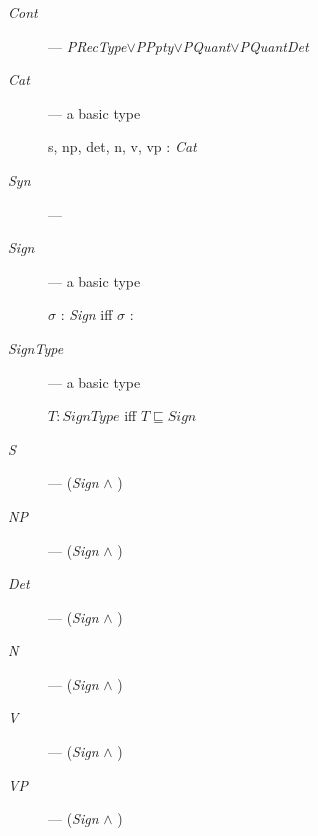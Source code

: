\begin{description}
    \item[\textnormal{\textit{Cont}}] --- \textit{PRecType}$\vee$\textit{PPpty}$\vee$\textit{PQuant}$\vee$\textit{PQuantDet}

      
    \item[\textnormal{\textit{Cat}}] --- a basic type

      s, np, det, n, v, vp : \textit{Cat}

    
    \item[\textnormal{\textit{Syn}}] ---   
 


  
    \item[\textnormal{\textit{Sign}}] ---  a basic type

      $\sigma$ : \textit{Sign} iff $\sigma$ :

  
\item[\textnormal{\textit{SignType}}] --- a basic type

  $T:\textit{SignType}$ iff $T\sqsubseteq\textit{Sign}$ 

  
\item[\textnormal{\textit{S}}] --- (\textit{Sign} \d{$\wedge$}
  )
  
\item[\textnormal{\textit{NP}}] --- (\textit{Sign} \d{$\wedge$}
  )

  
\item[\textnormal{\textit{Det}}] --- (\textit{Sign} \d{$\wedge$}
  )
  
\item[\textnormal{\textit{N}}] --- (\textit{Sign} \d{$\wedge$}
  )
  
\item[\textnormal{\textit{V}}] --- (\textit{Sign} \d{$\wedge$}
  )
  
\item[\textnormal{\textit{VP}}] --- (\textit{Sign} \d{$\wedge$}
  )


\end{description}
